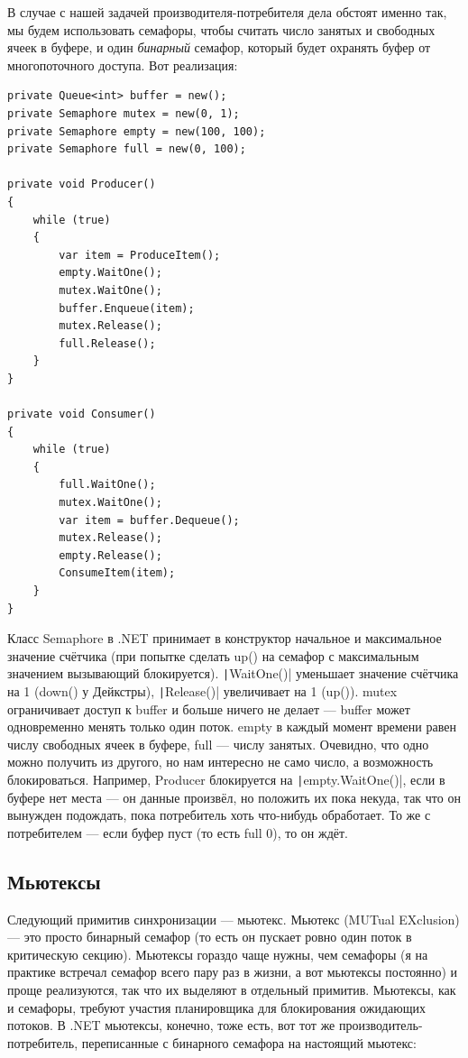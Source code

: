 \documentclass{../../text-style}
\begin{document}
В случае с нашей задачей производителя-потребителя дела обстоят именно так, мы будем использовать семафоры, чтобы считать число занятых и свободных ячеек в буфере, и один \textit{бинарный} семафор, который будет охранять буфер от многопоточного доступа. Вот реализация:

\begin{verbatim}
private Queue<int> buffer = new();
private Semaphore mutex = new(0, 1);
private Semaphore empty = new(100, 100);
private Semaphore full = new(0, 100);

private void Producer()
{
    while (true)
    {
        var item = ProduceItem();
        empty.WaitOne();
        mutex.WaitOne();
        buffer.Enqueue(item);
        mutex.Release();
        full.Release();
    }
}

private void Consumer()
{
    while (true)
    {
        full.WaitOne();
        mutex.WaitOne();
        var item = buffer.Dequeue();
        mutex.Release();
        empty.Release();
        ConsumeItem(item);
    }
}
\end{verbatim}

Класс Semaphore в .NET принимает в конструктор начальное и максимальное значение счётчика (при попытке сделать up() на семафор с максимальным значением вызывающий блокируется). \texttt|WaitOne()| уменьшает значение счётчика на 1 (down() у Дейкстры), \texttt|Release()| увеличивает на 1 (up()). mutex ограничивает доступ к buffer и больше ничего не делает --- buffer может одновременно менять только один поток. empty в каждый момент времени равен числу свободных ячеек в буфере, full --- числу занятых. Очевидно, что одно можно получить из другого, но нам интересно не само число, а возможность блокироваться. Например, Producer блокируется на \texttt|empty.WaitOne()|, если в буфере нет места --- он данные произвёл, но положить их пока некуда, так что он вынужден подождать, пока потребитель хоть что-нибудь обработает. То же с потребителем --- если буфер пуст (то есть full 0), то он ждёт.

\subsection{Мьютексы}

Следующий примитив синхронизации --- мьютекс. Мьютекс (MUTual EXclusion) --- это просто бинарный семафор (то есть он пускает ровно один поток в критическую секцию). Мьютексы гораздо чаще нужны, чем семафоры (я на практике встречал семафор всего пару раз в жизни, а вот мьютексы постоянно) и проще реализуются, так что их выделяют в отдельный примитив. Мьютексы, как и семафоры, требуют участия планировщика для блокирования ожидающих потоков. В .NET мьютексы, конечно, тоже есть, вот тот же производитель-потребитель, переписанные с бинарного семафора на настоящий мьютекс:
\end{document}
